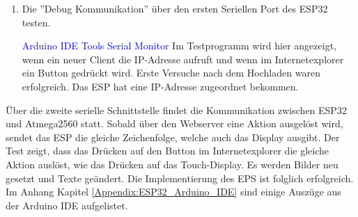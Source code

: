 \begin{enumerate}
\item Die ''Debug Kommunikation'' über den ersten Seriellen Port des ESP32 testen.

\textcolor{blue}{Arduino IDE \textrightarrow Tools \textrightarrow Serial Monitor}\newline
Im Testprogramm wird hier angezeigt, wenn ein neuer Client die IP-Adresse aufruft und wenn im Internetexplorer ein Button gedrückt wird. Erste Versuche nach dem Hochladen waren erfolgreich. Das ESP hat eine IP-Adresse zugeordnet bekommen.
\end{enumerate}

Über die zweite serielle Schnittstelle findet die Kommunikation zwischen ESP32 und Atmega2560 statt. Sobald über den Webserver eine Aktion ausgelöst wird, sendet das ESP die gleiche Zeichenfolge, welche auch das Display ausgibt. Der Test zeigt, dass das Drücken auf den Button im Internetexplorer die gleiche Aktion auslöst, wie das Drücken auf das Touch-Display. Es werden Bilder neu gesetzt und Texte geändert. Die Implementierung des EPS ist folglich erfolgreich. Im Anhang Kapitel \ref{Appendix:ESP32_Arduino_IDE} sind einige Auszüge aus der Arduino IDE aufgelistet.